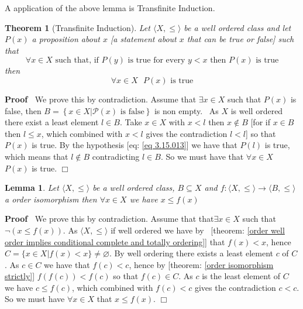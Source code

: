 \documentclass{book}
\newcommand{\nin}{\not\in}
\newenvironment{proof}{\noindent\textbf{Proof\ }}{\hspace*{\fill}$\Box$\medskip}
\newtheorem{lemma}{Lemma}
\newtheorem{theorem}{Theorem}
\begin{document}
A application of the above lemma is Transfinite Induction.

\begin{theorem}[Transfinite Induction]
  \label{order transfinite induction}{}Let
  $\langle X, \leqslant \rangle$ be a well ordered class and let $P (x)$ a
  proposition about $x$ [a statement about $x$ that can be true or false] such
  that
  \begin{equation}
    \label{eq 3.15.013} \forall x \in X \text{ such that, if $P (y)$ is true
    for every $y < x$ then $P (x) \text{ is true}$}
  \end{equation}
  then
  \[ \forall x \in X \text{ } P (x) \text{ is true} \]
\end{theorem}

\begin{proof}
  We prove this by contradiction. Assume that $\exists x \in X$ such that $P
  (x)$ is false, then $B = \left\{ x \in X|\mathcal{P} (x) \text{ is false}
  \right\}$ is non empty. \ As $X$ is well ordered there exist a least element
  $l \in B$. Take $x \in X$ with $x < l$ then $x \nin B$ [for if $x \in B$
  then $l \leqslant x$, which combined with $x < l$ gives the contradiction $l
  < l$] so that $P (x)$ is true. By the hypothesis [eq: \ref{eq 3.15.013}] we
  have that $P (l)$ is true, which means that $l \nin B$ contradicting $l \in
  B$. So we must have that $\forall x \in X$ $P (x)$ is true.
\end{proof}

\begin{lemma}
  \label{order well ordered and order isomorphism}Let $\langle X, \leqslant
  \rangle$ be a well ordered class, $B \subseteq X$ and $f : \langle X,
  \leqslant \rangle \rightarrow \langle B, \leqslant \rangle$ a order
  isomorphism then $\forall x \in X$ we have $x \leqslant f (x)$
\end{lemma}

\begin{proof}
  We prove this by contradiction. Assume that that$\exists x \in X$ such that
  $\neg (x \leqslant f (x))$. As $\langle X, \leqslant \rangle$ if well
  ordered we have by \ [theorem: \ref{order well order implies conditional
  complete and totally ordering}] that $f (x) < x$, hence $C = \{ x \in X|f
  (x) < x \} \neq \varnothing$. By well ordering there exists a least element
  $c$ of $C$. As $c \in C$ we have that $f (c) < c$, hence by [theorem:
  \ref{order isomorphism strictly}] $f (f (c)) < f (c)$ so that $f (c) \in C$.
  As $c$ is the least element of $C$ we have $c \leqslant f (c)$, which
  combined with $f (c) < c$ gives the contradiction $c < c$. So we must have
  $\forall x \in X$ that $x \leqslant f (x)$.
\end{proof}
\end{document}
